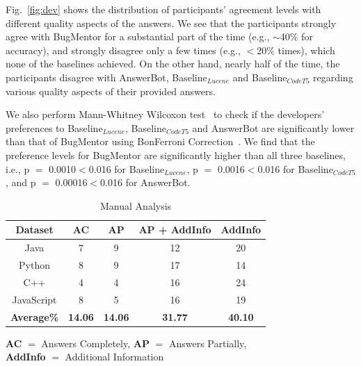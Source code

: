 Fig.~\ref{fig:dev} shows the distribution of participants’ agreement levels with different quality aspects of the answers. We see that the participants strongly agree with BugMentor for a substantial part of the time (e.g., $\sim$40\% for accuracy), and strongly disagree only a few times (e.g., $<$20\% times), which none of the baselines achieved. On the other hand, nearly half of the time, the participants disagree with AnswerBot, Baseline$_{Lucene}$ and Baseline$_{CodeT5}$ regarding various quality aspects of their provided answers.\par

We also perform Mann-Whitney Wilcoxon test~\cite{cuzick1985wilcoxon} to check if the developers' preferences to Baseline$_{Lucene}$, Baseline$_{CodeT5}$ and AnswerBot are significantly lower than that of BugMentor using BonFerroni Correction~\cite{weisstein2004bonferroni}. We find that the preference levels for BugMentor are significantly higher than all three baselines, i.e., p $=$ 0.0010$<$0.016 for Baseline$_{Lucene}$, p $=$ 0.0016$<$0.016 for  Baseline$_{CodeT5}$, and p $=$ 0.00016$<$0.016 for AnswerBot.

\renewcommand{\arraystretch}{1.2}
\begin{table}[htbp]
\caption{Manual Analysis}
\label{tab:manualanalysis}
\centering
\begin{threeparttable}
\begin{tabular}{|c|c|c|c|c|} \hline
\textbf{Dataset}   & \textbf{AC}    & \textbf{AP}    & \textbf{AP + AddInfo} & \textbf{AddInfo} \\ \hline \hline
Java & 7  & 9  & 12  & 20  \\ \hline
Python & 8  & 9 & 17  & 14  \\ \hline
C++  & 4 & 4 & 16  & 24 \\ \hline
JavaScript & 8  & 5  & 16  & 19  \\ \hline
\textbf{Average\%} & \textbf{14.06} & \textbf{14.06} & \textbf{31.77}        & \textbf{40.10}   \\ \hline
\end{tabular}   
\begin{tablenotes}
  \small
  \item \begin{center}
     \textbf{AC} $=$ Answers Completely, \textbf{AP} $=$ Answers Partially,\\ \textbf{AddInfo} $=$ Additional Information 
  \end{center}
\end{tablenotes}
\end{threeparttable}
\end{table}


